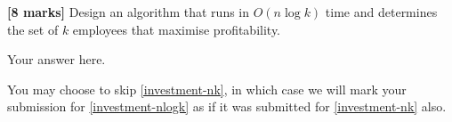 \documentclass{article}
\begin{document}
\begin{Question}
\begin{Subquestion}\label{investment-nlogk}
\textbf{[8 marks]} Design an algorithm that runs in $O(n \log k)$ time and determines the set of $k$ employees that maximise profitability.

\begin{answer}
Your answer here.
\end{answer}
\end{Subquestion}

\begin{clar}
You may choose to skip \ref{investment-nk}, in which case we will mark your submission for \ref{investment-nlogk} as if it was submitted for \ref{investment-nk} also.
\end{clar}
\end{Question}
\end{document}
